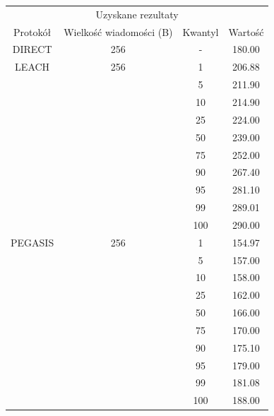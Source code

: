 \documentclass[a4paper,12pt,twoside,openany]{report}
\begin{document}
\begin{longtable}{*{4}{c}}
\toprule
\multicolumn{4}{c}{Uzyskane rezultaty} \\
Protokół	& Wielkość wiadomości (B)	& Kwantyl	& Wartość \\
\midrule
\endhead
DIRECT	& 256 	& -	& 180.00 \\*
\midrule
LEACH	& 256	& 1	& 206.88 \\*
	&	& 5	& 211.90 \\*
	&	& 10	& 214.90 \\*
	&	& 25	& 224.00 \\*
	&	& 50	& 239.00 \\*
	&	& 75	& 252.00 \\*
	&	& 90	& 267.40 \\*
	&	& 95	& 281.10 \\*
	&	& 99	& 289.01 \\*
	&	& 100	& 290.00 \\*
\midrule
PEGASIS	& 256	& 1	& 154.97 \\*
	&	& 5	& 157.00 \\*
	&	& 10	& 158.00 \\*
	&	& 25	& 162.00 \\*
	&	& 50	& 166.00 \\*
	&	& 75	& 170.00 \\*
	&	& 90	& 175.10 \\*
	&	& 95	& 179.00 \\*
	&	& 99	& 181.08 \\*
	&	& 100	& 188.00 \\*
\bottomrule
\end{longtable}
\end{document}
